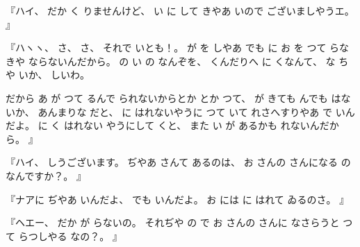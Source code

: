 %
『ハイ、
%
だか
く
りませんけど、
%
い
に
して
きやあ
いので
ございましやうエ。
』

%
『ハヽヽ、
%
さ、
%
さ、
%
それで
いとも！。
%
が
を
しやあ
でも
に
お
を
つて
らなきや
ならないんだから。
%
の
い
の
なんぞを、
%
くんだりへ
に
くなんて、
%
な
ちや
いか、
%
しいわ。

%
だから
あ
が
つて
るんで
られないからとか
とか
つて、
%
が
きても
んでも
はないか、
%
あんまりな
だと、
%
%
に
はれないやうに
つて
いて
れさへすりやあ
で
いんだよ。
%
に
く
はれない
やうにして
くと、
%
また
い
が
あるかも
れないんだから。
』

%
『ハイ、
%
しうございます。
%
ぢやあ
さんて
あるのは、
%
お
さんの
さんになる%
の
なんですか？。
』

%
『ナアに
ぢやあ
いんだよ、
%
でも
いんだよ。
%
お
には
に
はれて
ゐるのさ。
』

%
『ヘエー、
%
だか
が
らないの。
%
それぢや
の
で
お
さんの
さんに%
なさらうと
つて
らつしやる
なの？。
』

